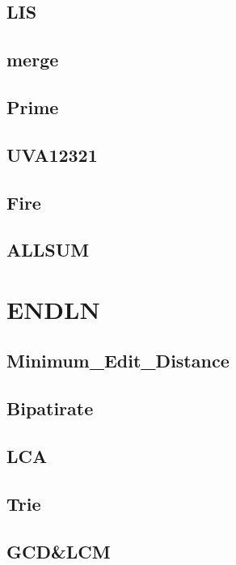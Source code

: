     \subsection{LIS}
        
    \subsection{merge}
          
    \subsection{Prime}
        
    \subsection{UVA12321}
        
    \subsection{Fire}
        
    \subsection{ALLSUM}
        

\section{ENDLN}
    \subsection{Minimum_Edit_Distance}
        
    \subsection{Bipatirate}
        
    \subsection{LCA}
        
    \subsection{Trie}
        
    \subsection{GCD&LCM}
        
